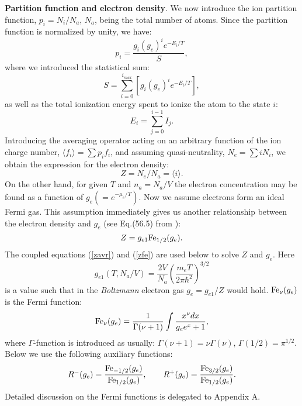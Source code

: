 {\bf Partition function and electron density}. We now introduce the ion partition function, $p_i=N_i/N_a$, $N_a$, being 
the total number of atoms. Since the partition function is normalized by unity,
we have:
\begin{equation}
p_i=\frac{g_i(g_e)^ie^{-E_i/T}}S,
\end{equation}
where we introduced the statistical sum:
\begin{equation}
S=\sum_{i=0}^{i_{max}}\left[g_i(g_e)^ie^{-E_i/T}\right],
\end{equation}
as well as the total ionization energy spent to ionize the atom to the state $i$:
\begin{equation}
E_i=\sum_{j=0}^{i-1}I_j.
\end{equation}
Introducing the averaging operator acting on an arbitrary function of the ion charge number, $\langle f_i\rangle=\sum p_if_i$, and assuming quasi-neutrality, $N_e = \sum{i N_i}$, we
obtain the expression for the electron density:
\begin{equation}\label{zavr}
Z=N_e/N_a=\langle i\rangle.
\end{equation}
On the other hand, for given $T$ and $n_a=N_a/V$ the electron concentration may be found as a function of $g_e(=e^{-\mu_e/T})$.
Now we assume electrons form an ideal Fermi gas.
This assumption immediately gives us another relationship between the electron density and $g_e$ (see Eq.(56.5) from \cite{ll}):
\begin{equation}\label{zfe}
Z=g_{e1}{\rm Fe}_{1/2}(g_e).
\end{equation}
The coupled equations (\ref{zavr}) and (\ref{zfe}) are used below to solve $Z$ and $g_e$. Here
\begin{equation}
g_{e1}(T,N_a/V)=\frac{2V}{N_a}\left(\frac{m_eT}{2\pi \hbar^2}\right)^{3/2}
\end{equation}
is a value such that in the {\it Boltzmann} electron gas $g_e = g_{e1}/Z$ would hold. ${\rm Fe}_\nu(g_e)$ is the Fermi function:
\begin{equation}
{\rm Fe}_\nu(g_e)=\frac1{\Gamma(\nu+1)}\int{\frac{x^\nu dx}{g_ee^x+1}},
\end{equation}
where $\Gamma$-function is introduced as usually: $\Gamma(\nu+1)=\nu \Gamma(\nu),\,\Gamma(1/2)=\pi^{1/2}$.
Below we use the following auxiliary functions:
\begin{equation}
R^-(g_e)=\frac{{\rm Fe}_{-1/2}(g_e)}{{\rm Fe}_{1/2}(g_e)}, \qquad
R^+(g_e)=\frac{{\rm Fe}_{3/2}(g_e)}{{\rm Fe}_{1/2}(g_e)}.
\end{equation}
Detailed discussion on the Fermi functions is delegated to Appendix A.

